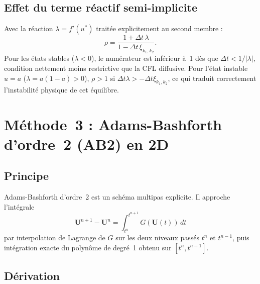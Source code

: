 \documentclass[11pt,a4paper]{report}
\begin{document}
\subsection*{Effet du terme r\'eactif semi-implicite}

Avec la r\'eaction $\lambda=f'(u^*)$ trait\'ee explicitement au second membre :
\begin{equation}
  \rho = \frac{1+\Delta t\,\lambda}{1-\Delta t\,\xi_{k_1,k_2}}.
\end{equation}
Pour les \'etats stables ($\lambda<0$), le num\'erateur est inf\'erieur \`a~1 d\`es que
$\Delta t<1/|\lambda|$, condition nettement moins restrictive que la CFL diffusive.
Pour l'\'etat instable $u=a$ ($\lambda=a(1-a)>0$), $\rho>1$ si
$\Delta t\lambda>-\Delta t\xi_{k_1,k_2}$, ce qui traduit correctement l'instabilit\'e
physique de cet \'equilibre.



\section{M\'ethode~3 : Adams-Bashforth d'ordre~2 (AB2) en 2D}

\subsection*{Principe}

Adams-Bashforth d'ordre~2 est un sch\'ema multipas explicite. Il approche l'int\'egrale
\begin{equation}
  \mathbf{U}^{n+1} - \mathbf{U}^n = \int_{t^n}^{t^{n+1}} G(\mathbf{U}(t))\,dt
\end{equation}
par interpolation de Lagrange de $G$ sur les deux niveaux pass\'es $t^n$ et $t^{n-1}$,
puis int\'egration exacte du polyn\^ome de degr\'e~1 obtenu sur $[t^n,t^{n+1}]$.

\subsection*{D\'erivation}
\end{document}

